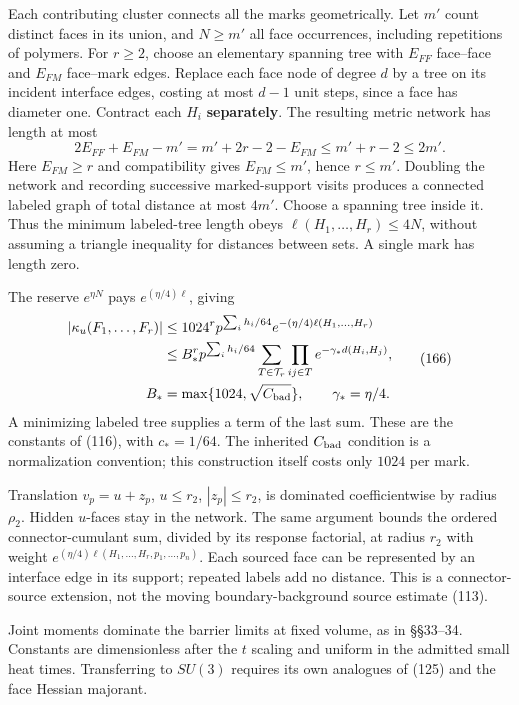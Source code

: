 \documentclass[11pt,a4paper]{article}
\begin{document}
Each contributing cluster connects all the marks geometrically. Let
\(m'\) count distinct faces in its union, and \(N\ge m'\) all face
occurrences, including repetitions of polymers. For \(r\ge2\), choose an
elementary spanning tree with \(E_{FF}\) face--face and \(E_{FM}\)
face--mark edges. Replace each face node of degree \(d\) by a tree on
its incident interface edges, costing at most \(d-1\) unit steps, since
a face has diameter one. Contract each \(H_i\) \textbf{separately}. The
resulting metric network has length at most \[2E_{FF}+E_{FM}-m'
 =m'+2r-2-E_{FM}\le m'+r-2\le2m'.\] Here \(E_{FM}\ge r\) and
compatibility gives \(E_{FM}\le m'\), hence \(r\le m'\). Doubling the
network and recording successive marked-support visits produces a
connected labeled graph of total distance at most \(4m'\). Choose a
spanning tree inside it. Thus the minimum labeled-tree length obeys
\(\ell(H_1,\ldots,H_r)\le4N\), without assuming a triangle inequality
for distances between sets. A single mark has length zero.

The reserve \(e^{\eta N}\) pays \(e^{(\eta/4)\ell}\), giving
\[\begin{aligned}
|\kappa_u(F_1,\ldots,F_r)|
 &\le1024^r p^{\sum_i h_i/64}
       e^{-(\eta/4)\ell(H_1,\ldots,H_r)}\\
 &\le B_*^r p^{\sum_i h_i/64}
       \sum_{T\in\mathcal T_r}\prod_{ij\in T}
                   e^{-\gamma_*d(H_i,H_j)},\\
B_*&=\max\{1024,\sqrt{C_{\rm bad}}\},\qquad\gamma_*=\eta/4.
\end{aligned}\tag{166}\] A minimizing labeled tree supplies a term of
the last sum. These are the constants of (116), with \(c_*=1/64\). The
inherited \(C_{\rm bad}\) condition is a normalization convention; this
construction itself costs only \(1024\) per mark.

Translation \(v_p=u+z_p\), \(u\le r_2\), \(|z_p|\le r_2\), is dominated
coefficientwise by radius \(\rho_2\). Hidden \(u\)-faces stay in the
network. The same argument bounds the ordered connector-cumulant sum,
divided by its response factorial, at radius \(r_2\) with weight
\(e^{(\eta/4)\ell(H_1,\ldots,H_r,p_1,\ldots,p_n)}\). Each sourced face
can be represented by an interface edge in its support; repeated labels
add no distance. This is a connector-source extension, not the moving
boundary-background source estimate (113).

Joint moments dominate the barrier limits at fixed volume, as in
§§33--34. Constants are dimensionless after the \(t\) scaling and
uniform in the admitted small heat times. Transferring to \(SU(3)\)
requires its own analogues of (125) and the face Hessian majorant.
\end{document}
